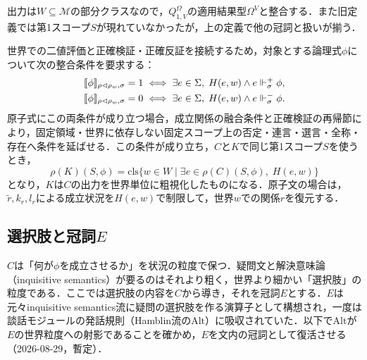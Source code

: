 \documentclass[../../main-detail.tex]{subfiles}
\begin{document}
\begin{remark}[型的制約]
    出力は$W \subseteq \mathcal{M}$の部分クラスなので，$Q^\Omega_{1,V}$の適用結果型$\Omega^V$と整合する．また旧定義では第1スコープ$S$が現れていなかったが，上の定義で他の冠詞と扱いが揃う．
\end{remark}
\begin{remark}[$K$は$C$の粗視化である]
    世界での二値評価と正確検証・正確反証を接続するため，対象とする論理式$\phi$について次の整合条件を要求する：
    \begin{align*}
        \llbracket\phi\rrbracket_{\rho\vartriangleleft\rho_w,\sigma}=1
        &\iff\exists e\in\Sigma,\;H(e,w)\land e\Vdash^{+}_\sigma\phi,\\
        \llbracket\phi\rrbracket_{\rho\vartriangleleft\rho_w,\sigma}=0
        &\iff\exists e\in\Sigma,\;H(e,w)\land e\Vdash^{-}_\sigma\phi.
    \end{align*}
    原子式にこの両条件が成り立つ場合，成立関係の融合条件と正確検証の再帰節により，固定領域・世界に依存しない固定スコープ上の否定・連言・選言・全称・存在へ条件を延ばせる．この条件が成り立ち，$C$と$K$で同じ第1スコープ$S$を使うとき，
    \[
        \rho(K)(S,\phi)=\mathrm{cls}\{w\in W\mid\exists e\in\rho(C)(S,\phi),\;H(e,w)\}
    \]
    となり，$K$は$C$の出力を世界単位に粗視化したものになる．原子文の場合は，$\tilde r,k_r,l_r$による成立状況を$H(e,w)$で制限して，世界$w$での関係$r$を復元する．
\end{remark}
\subsection{選択肢と冠詞$E$}
$C$は「何が$\phi$を成立させるか」を状況の粒度で保つ．疑問文と解決意味論（inquisitive semantics）が要るのはそれより粗く，世界より細かい「選択肢」の粒度である．ここでは選択肢の内容を$C$から導き，それを冠詞$E$とする．$E$は元々inquisitive semantics流に疑問の選択肢を作る演算子として構想され，一度は談話モジュールの発話規則（Hamblin流の$\mathrm{Alt}$）に吸収されていた．以下で$\mathrm{Alt}$が$E$の世界粒度への射影であることを確かめ，$E$を文内の冠詞として復活させる（2026-08-29，暫定）．
\end{document}
